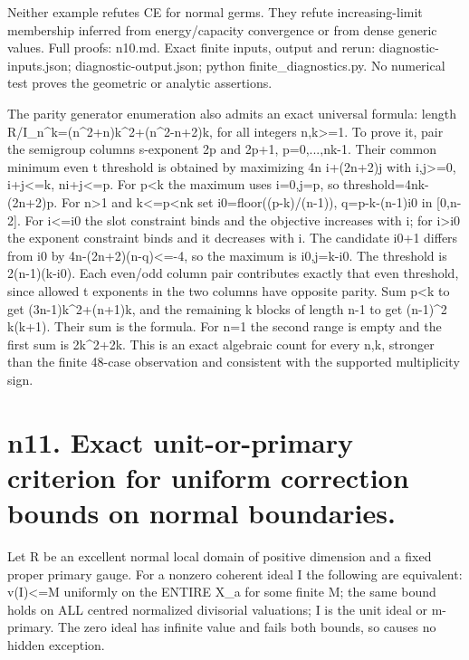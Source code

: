 \documentclass[11pt]{article}
\begin{document}
Neither example refutes CE for normal germs. They refute increasing-limit membership inferred from energy/capacity convergence or from dense generic values. Full proofs: n10.md. Exact finite inputs, output and rerun: diagnostic-inputs.json; diagnostic-output.json; python finite\_diagnostics.py. No numerical test proves the geometric or analytic assertions.

The parity generator enumeration also admits an exact universal formula:
 length R/I\_n\textasciicircum{}k=(n\textasciicircum{}2+n)k\textasciicircum{}2+(n\textasciicircum{}2-n+2)k, for all integers n,k>=1.
To prove it, pair the semigroup columns s-exponent 2p and 2p+1, p=0,...,nk-1. Their common minimum even t threshold is obtained by maximizing 4n i+(2n+2)j with i,j>=0, i+j<=k, ni+j<=p. For p<k the maximum uses i=0,j=p, so threshold=4nk-(2n+2)p. For n>1 and k<=p<nk set i0=floor((p-k)/(n-1)), q=p-k-(n-1)i0 in [0,n-2]. For i<=i0 the slot constraint binds and the objective increases with i; for i>i0 the exponent constraint binds and it decreases with i. The candidate i0+1 differs from i0 by 4n-(2n+2)(n-q)<=-4, so the maximum is i0,j=k-i0. The threshold is 2(n-1)(k-i0). Each even/odd column pair contributes exactly that even threshold, since allowed t exponents in the two columns have opposite parity. Sum p<k to get (3n-1)k\textasciicircum{}2+(n+1)k, and the remaining k blocks of length n-1 to get (n-1)\textasciicircum{}2 k(k+1). Their sum is the formula. For n=1 the second range is empty and the first sum is 2k\textasciicircum{}2+2k. This is an exact algebraic count for every n,k, stronger than the finite 48-case observation and consistent with the supported multiplicity sign.


\section*{n11. Exact unit-or-primary criterion for uniform correction bounds on normal boundaries.}
Let R be an excellent normal local domain of positive dimension and a fixed proper primary gauge. For a nonzero coherent ideal I the following are equivalent: v(I)<=M uniformly on the ENTIRE X\_a for some finite M; the same bound holds on ALL centred normalized divisorial valuations; I is the unit ideal or m-primary. The zero ideal has infinite value and fails both bounds, so causes no hidden exception.
\end{document}
